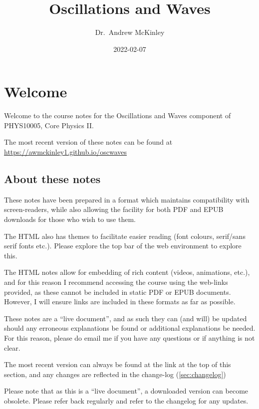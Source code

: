 \documentclass[
]{book}
\title{Oscillations and Waves}
\author{Dr.~Andrew McKinley}
\date{2022-02-07}
\begin{document}
\maketitle

{
\setcounter{tocdepth}{1}
\tableofcontents
}
\hypertarget{welcome}{%
\chapter*{Welcome}\label{welcome}}

Welcome to the course notes for the Oscillations and Waves component of PHYS10005, Core Physics II.

The most recent version of these notes can be found at \url{https://awmckinley1.github.io/oscwaves}

\hypertarget{about-these-notes}{%
\section*{About these notes}\label{about-these-notes}}

These notes have been prepared in a format which maintains compatibility with screen-readers, while also allowing the facility for both PDF and EPUB downloads for those who wish to use them.

The HTML also has themes to facilitate easier reading (font colours, serif/sans serif fonts etc.). Please explore the top bar of the web environment to explore this.

The HTML notes allow for embedding of rich content (videos, animations, etc.), and for this reason I recommend accessing the course using the web-links provided, as these cannot be included in static PDF or EPUB documents. However, I will ensure links are included in these formats as far as possible.

These notes are a ``live document'', and as such they can (and will) be updated should any erroneous explanations be found or additional explanations be needed. For this reason, please do email me if you have any questions or if anything is not clear.

The most recent version can always be found at the link at the top of this section, and any changes are reflected in the change-log (\ref{sec:changelog})

Please note that as this is a ``live document'', a downloaded version can become obsolete. Please refer back regularly and refer to the changelog for any updates.
\end{document}
